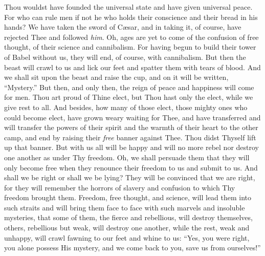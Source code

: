 Thou wouldst have founded the universal state and have given universal
peace. For who can rule men if not he who holds their conscience and
their bread in his hands? We have taken the sword of C\ae sar, and in
taking it, of course, have rejected Thee and followed \textit{him}.
Oh, ages are yet to come of the confusion of free thought, of their
science and cannibalism. For having begun to build their tower of
Babel without us, they will end, of course, with cannibalism. But then
the beast will crawl to us and lick our feet and spatter them with
tears of blood. And we shall sit upon the beast and raise the cup, and
on it will be written, ``Mystery.'' But then, and only then, the reign
of peace and happiness will come for men. Thou art proud of Thine
elect, but Thou hast only the elect, while we give rest to all. And
besides, how many of those elect, those mighty ones who could become
elect, have grown weary waiting for Thee, and have transferred and
will transfer the powers of their spirit and the warmth of their heart
to the other camp, and end by raising their \textit{free} banner
against Thee. Thou didst Thyself lift up that banner. But with us all
will be happy and will no more rebel nor destroy one another as under
Thy freedom. Oh, we shall persuade them that they will only become
free when they renounce their freedom to us and submit to us. And
shall we be right or shall we be lying? They will be convinced that we
are right, for they will remember the horrors of slavery and confusion
to which Thy freedom brought them. Freedom, free thought, and science,
will lead them into such straits and will bring them face to face with
such marvels and insoluble mysteries, that some of them, the fierce
and rebellious, will destroy themselves, others, rebellious but
weak, will destroy one another, while the rest, weak and unhappy, will
crawl fawning to our feet and whine to us: ``Yes, you were right, you
alone possess His mystery, and we come back to you, save us from
ourselves!''

